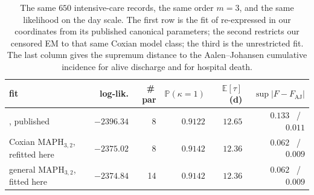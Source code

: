 \documentclass{article}
\newcommand{\Prob}{\mathbb{P}}
\newcommand{\ex}[1]{\mathbb{E}\left[#1\right]}
\newenvironment{rcrevision}{}{}
\begin{document}
\begin{table}[ht]
\centering
\begin{rcrevision}
\begin{tabular}{l r r r r r}
\toprule
fit & log-lik. & \#\,par & $\Prob(\kappa=1)$ & $\ex{\tau}$ (d) & $\sup|F-F_{\text{AJ}}|$ \\
\midrule
\citet{lindqvist_phase-type_2022}, published & $-2396.34$ & 8  & $0.9122$ & $12.65$ & $0.133$ \, / \, $0.011$ \\
Coxian $\text{MAPH}_{3,2}$, refitted here             & $-2375.02$ & 8  & $0.9142$ & $12.36$ & $0.062$ \, / \, $0.009$ \\
general $\text{MAPH}_{3,2}$, fitted here              & $\mathbf{-2374.84}$ & 14 & $0.9142$ & $12.36$ & $\mathbf{0.062}$ \, / \, $0.009$ \\
\bottomrule
\end{tabular}
\caption{The same $650$ intensive-care records, the same order $m=3$, and the same likelihood on the day scale. The first row is the fit of \citet{lindqvist_phase-type_2022} re-expressed in our coordinates from its published canonical parameters; the second restricts our censored EM to that same Coxian model class; the third is the unrestricted fit. The last column gives the supremum distance to the Aalen--Johansen cumulative incidence for alive discharge and for hospital death.}
\label{tab:icu-lindqvist}
\end{rcrevision}
\end{table}
\end{document}
